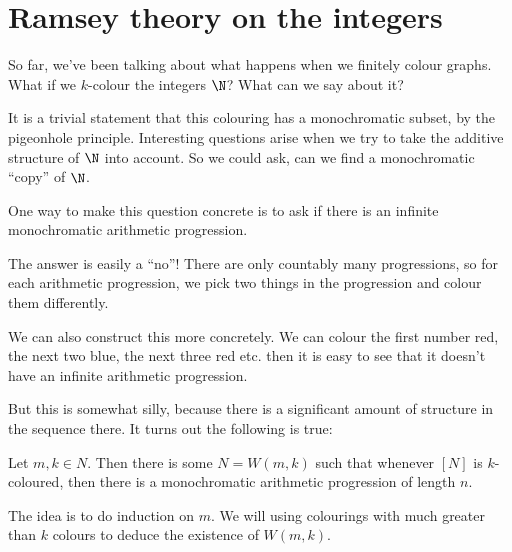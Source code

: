 \documentclass[a4paper]{article}
\begin{document}
\section{Ramsey theory on the integers}
So far, we've been talking about what happens when we finitely colour graphs. What if we $k$-colour the integers $\N$? What can we say about it?

It is a trivial statement that this colouring has a monochromatic subset, by the pigeonhole principle. Interesting questions arise when we try to take the additive structure of $\N$ into account. So we could ask, can we find a monochromatic ``copy'' of $\N$.

One way to make this question concrete is to ask if there is an infinite monochromatic arithmetic progression.

The answer is easily a ``no''! There are only countably many progressions, so for each arithmetic progression, we pick two things in the progression and colour them differently.

We can also construct this more concretely. We can colour the first number red, the next two blue, the next three red etc. then it is easy to see that it doesn't have an infinite arithmetic progression. %

But this is somewhat silly, because there is a significant amount of structure in the sequence there. It turns out the following is true:
\begin{thm}
  Let $m, k \in N$. Then there is some $N = W(m, k)$ such that whenever $[N]$ is $k$-coloured, then there is a monochromatic arithmetic progression of length $n$.
\end{thm}

The idea is to do induction on $m$. We will using colourings with much greater than $k$ colours to deduce the existence of $W(m, k)$.
\end{document}
